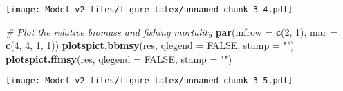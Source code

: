 \documentclass[
]{article}
\newenvironment{Shaded}{\begin{snugshade}}{\end{snugshade}}
\newcommand{\CommentTok}[1]{\textcolor[rgb]{0.56,0.35,0.01}{\textit{#1}}}
\newcommand{\DataTypeTok}[1]{\textcolor[rgb]{0.13,0.29,0.53}{#1}}
\newcommand{\DecValTok}[1]{\textcolor[rgb]{0.00,0.00,0.81}{#1}}
\newcommand{\KeywordTok}[1]{\textcolor[rgb]{0.13,0.29,0.53}{\textbf{#1}}}
\newcommand{\NormalTok}[1]{#1}
\newcommand{\OtherTok}[1]{\textcolor[rgb]{0.56,0.35,0.01}{#1}}
\newcommand{\StringTok}[1]{\textcolor[rgb]{0.31,0.60,0.02}{#1}}
\begin{document}
\texttt{[image: Model\_v2\_files/figure-latex/unnamed-chunk-3-4.pdf]}

\begin{Shaded}
\begin{Highlighting}[]
\CommentTok{# Plot the relative biomass and fishing mortality}
\KeywordTok{par}\NormalTok{(}\DataTypeTok{mfrow =} \KeywordTok{c}\NormalTok{(}\DecValTok{2}\NormalTok{, }\DecValTok{1}\NormalTok{), }\DataTypeTok{mar =} \KeywordTok{c}\NormalTok{(}\DecValTok{4}\NormalTok{, }\DecValTok{4}\NormalTok{, }\DecValTok{1}\NormalTok{, }\DecValTok{1}\NormalTok{))}
\KeywordTok{plotspict.bbmsy}\NormalTok{(res, }\DataTypeTok{qlegend =} \OtherTok{FALSE}\NormalTok{, }\DataTypeTok{stamp =} \StringTok{""}\NormalTok{)}
\KeywordTok{plotspict.ffmsy}\NormalTok{(res, }\DataTypeTok{qlegend =} \OtherTok{FALSE}\NormalTok{, }\DataTypeTok{stamp =} \StringTok{""}\NormalTok{)}
\end{Highlighting}
\end{Shaded}

\texttt{[image: Model\_v2\_files/figure-latex/unnamed-chunk-3-5.pdf]}
\end{document}
